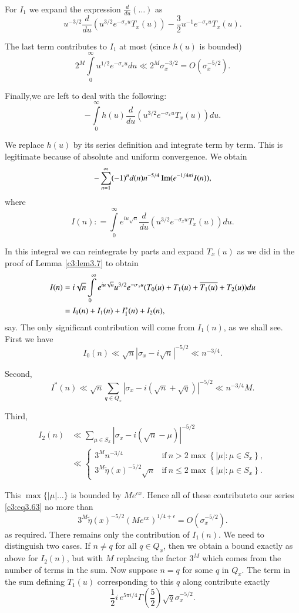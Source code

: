 For $I_1$ we expand the expression $\frac{d}{du} (\ldots)$ as
$$
u^{-3/2} \frac{d}{du} (u^{3/2} e^{-\sigma_x u} T_x (u)) - \frac{3}{2}
u^{-1} e^{-\sigma_x u} T_x (u).
$$

The last term contributes to $I_1$ at most (since $h(u)$ is bounded)
$$
2^M \int\limits_0^\infty u^{1/2} e^{-\sigma_x u} du\ll 2^M
\sigma^{-3/2}_x = O(\sigma^{-5/2}_x).
$$

Finally,\pageoriginale we are left to deal with the following:
$$
- \int\limits_0^\infty h(u) \frac{d}{du} \left(u^{3/2} e^{-\sigma_x u}
T_x (u)\right) du.
$$

We replace $h(u)$ by its series definition and integrate term by
term. This is legitimate because of absolute and uniform
convergence. We obtain
\begin{equation}
  - \sum_{n=1}^\infty (-1)^n d(n) n^{-5/4} \operatorname{Im} (e^{-1/4 \pi i} I
  (n)),\label{c3:eq3.63} 
\end{equation}
where 
$$
I(n) : = \int\limits_0^\infty e^{iu \sqrt{n}} \frac{d}{du} (u^{3/2}
e^{-\sigma_x u} T_x (u)) du.
$$

In this integral we can reintegrate by parts and expand $T_x(u)$ as we
did in the proof of Lemma \ref{c3:lem3.7} to obtain 
\begin{align*}
  I (n) & = i \sqrt{n} \int\limits_0^\infty e^{iu\sqrt{n}}
  u^{3/2}e^{-\sigma_x u} (T_0 (u) + T_1 (u)+ \overline{T_1 (u)} + T_2
  (u))du\\
  & = I_0 (n) + I_1 (n) + I_1^* (n) + I_2 (n),
\end{align*}
say. The only significant contribution will come from $I_1(n)$, as we
shall see. First we have
$$
I_0 (n) \ll \sqrt{n} |\sigma_x - i \sqrt{n}|^{-5/2} \ll n^{-3/4}.
$$

Second, 
$$
I^* (n) \ll \sqrt{n} \sum_{q \in Q_x} |\sigma_x - i(\sqrt{n}+
\sqrt{q})|^{-5/2} \ll n^{-3/4} M.
$$

Third,
\begin{align*}
  I_2(n) & \ll \sum_{\mu \in S_x} |\sigma_x - i(\sqrt{n}-
  \mu)|^{-5/2}\\[5pt]
  & \ll \begin{cases}
    3^{M}n^{- 3/4} & \text{if}~ n > 2 \max \left\{ |\mu| : \mu \in
    S_x\right\},\\
    3^M \tilde{\eta}(x)^{-5/2} \sqrt{n} & \text{if}~ n \leq 2 \max
    \left\{|\mu|: \mu \in S_x \right\}.
  \end{cases}
\end{align*}

This $\max \{ |\mu|\ldots\}$ is bounded by $M e^{cx}$. Hence all of
these contribute\pageoriginale to our series \eqref{c3:eq3.63} no more
than
$$
3^M \tilde{\eta} (x)^{-5/2}(Me^{cx})^{1/4+\epsilon} = O(\sigma_x^{-5/2}). 
$$
as required. There remains only the contribution of $I_1(n)$. We need
to distinguish two cases. If $n \neq q$ for all $q \in Q_x$, then we
obtain a bound exactly as above for $I_2 (n)$, but with $M$ replacing
the factor $3^M$ which comes from the number of terms in the sum. Now
suppose $n=q$ for some $q$ in $Q_x$. The term in the sum defining
$T_1(u)$ corresponding to this $q$ along contribute exactly
$$
\frac{1}{2}  i \, e^{5 \pi i/4} \Gamma \left(\frac{5}{2} \right)
\sqrt{q} \sigma_x^{-5/2}.
$$

